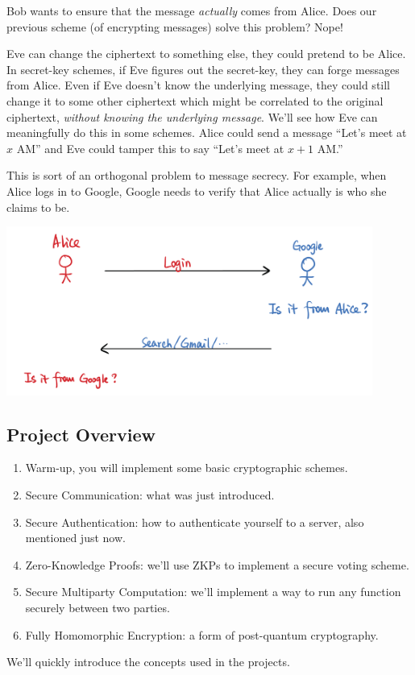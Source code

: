 Bob wants to ensure that the message \emph{actually} comes from Alice. Does our previous scheme (of encrypting messages) solve this problem? Nope!

Eve can change the ciphertext to something else, they could pretend to be Alice. In secret-key schemes, if Eve figures out the secret-key, they can forge messages from Alice. Even if Eve doesn't know the underlying message, they could still change it to some other ciphertext which might be correlated to the original ciphertext, \emph{without knowing the underlying message}. We'll see how Eve can meaningfully do this in some schemes. Alice could send a message ``Let's meet at $x$ AM'' and Eve could tamper this to say ``Let's meet at $x+1$ AM.''

This is sort of an orthogonal problem to message secrecy. For example, when Alice logs in to Google, Google needs to verify that Alice actually is who she claims to be.

\begin{center}
    \includegraphics[width=0.9\textwidth]{images/2023-01-26/authentication.png}
\end{center}

\subsection{Project Overview}
\begin{enumerate}
    \setcounter{enumi}{0}
    \item Warm-up, you will implement some basic cryptographic schemes.
    \item Secure Communication: what was just introduced.
    \item Secure Authentication: how to authenticate yourself to a server, also mentioned just now.
    \item Zero-Knowledge Proofs: we'll use ZKPs to implement a secure voting scheme.
    \item Secure Multiparty Computation: we'll implement a way to run any function securely between two parties.
    \item Fully Homomorphic Encryption: a form of post-quantum cryptography.
\end{enumerate}
We'll quickly introduce the concepts used in the projects.


